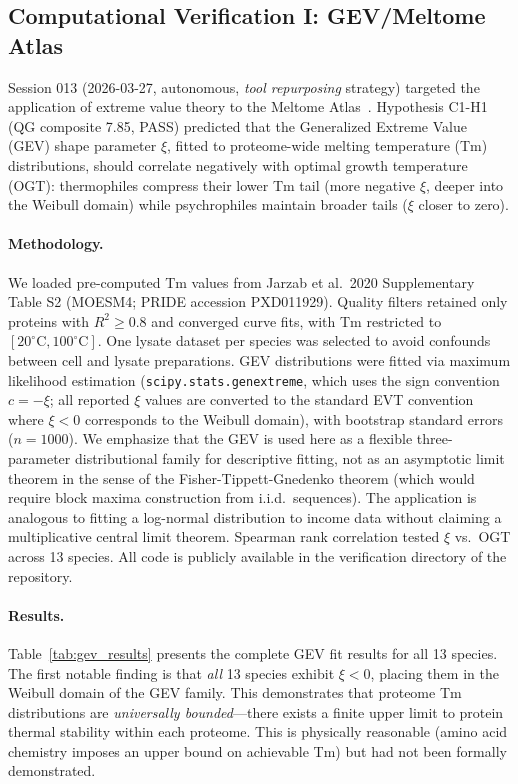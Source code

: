 \subsection{Computational Verification I: GEV/Meltome Atlas}
\label{sec:gev}

Session 013 (2026-03-27, autonomous, \emph{tool repurposing} strategy) targeted the application of extreme value theory to the Meltome Atlas~\citep{jarzab2020}. Hypothesis C1-H1 (QG composite 7.85, PASS) predicted that the Generalized Extreme Value (GEV) shape parameter $\xi$, fitted to proteome-wide melting temperature (Tm) distributions, should correlate negatively with optimal growth temperature (OGT): thermophiles compress their lower Tm tail (more negative $\xi$, deeper into the Weibull domain) while psychrophiles maintain broader tails ($\xi$ closer to zero).

\paragraph{Methodology.} We loaded pre-computed Tm values from Jarzab et al.\ 2020 Supplementary Table S2 (MOESM4; PRIDE accession PXD011929). Quality filters retained only proteins with $R^2 \geq 0.8$ and converged curve fits, with Tm restricted to $[20^\circ\text{C}, 100^\circ\text{C}]$. One lysate dataset per species was selected to avoid confounds between cell and lysate preparations. GEV distributions were fitted via maximum likelihood estimation (\texttt{scipy.stats.genextreme}, which uses the sign convention $c = -\xi$; all reported $\xi$ values are converted to the standard EVT convention where $\xi < 0$ corresponds to the Weibull domain), with bootstrap standard errors ($n = 1000$). We emphasize that the GEV is used here as a flexible three-parameter distributional family for descriptive fitting, not as an asymptotic limit theorem in the sense of the Fisher-Tippett-Gnedenko theorem (which would require block maxima construction from i.i.d.\ sequences). The application is analogous to fitting a log-normal distribution to income data without claiming a multiplicative central limit theorem. Spearman rank correlation tested $\xi$ vs.\ OGT across 13 species. All code is publicly available in the verification directory of the repository.

\paragraph{Results.} Table~\ref{tab:gev_results} presents the complete GEV fit results for all 13 species. The first notable finding is that \emph{all} 13 species exhibit $\xi < 0$, placing them in the Weibull domain of the GEV family. This demonstrates that proteome Tm distributions are \emph{universally bounded}---there exists a finite upper limit to protein thermal stability within each proteome. This is physically reasonable (amino acid chemistry imposes an upper bound on achievable Tm) but had not been formally demonstrated.


